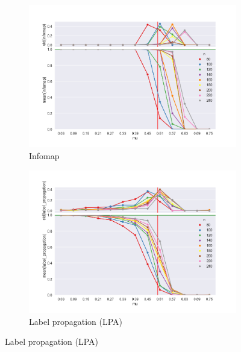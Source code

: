 \begin{figure}
    \begin{subfigure}[b]{0.32\textwidth}
        \includegraphics[width=\textwidth]{fig/ami_vs_mu_infomap}
        \caption{Infomap}
        \label{fig:mouse}
    \end{subfigure}
	\qquad
    \begin{subfigure}[b]{0.32\textwidth}
        \includegraphics[width=\textwidth]{fig/ami_vs_mu_label_propagation}
        \caption{Label propagation (LPA)}
        \label{fig:gull}
    \end{subfigure}
      

\end{figure}
